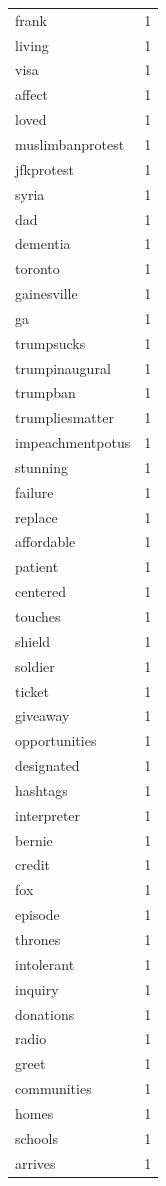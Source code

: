 \begin{tabular}{lr}
frank & 1 \\
living & 1 \\
visa & 1 \\
affect & 1 \\
loved & 1 \\
muslimbanprotest & 1 \\
jfkprotest & 1 \\
syria & 1 \\
dad & 1 \\
dementia & 1 \\
toronto & 1 \\
gainesville & 1 \\
ga & 1 \\
trumpsucks & 1 \\
trumpinaugural & 1 \\
trumpban & 1 \\
trumpliesmatter & 1 \\
impeachmentpotus & 1 \\
stunning & 1 \\
failure & 1 \\
replace & 1 \\
affordable & 1 \\
patient & 1 \\
centered & 1 \\
touches & 1 \\
shield & 1 \\
soldier & 1 \\
ticket & 1 \\
giveaway & 1 \\
opportunities & 1 \\
designated & 1 \\
hashtags & 1 \\
interpreter & 1 \\
bernie & 1 \\
credit & 1 \\
fox & 1 \\
episode & 1 \\
thrones & 1 \\
intolerant & 1 \\
inquiry & 1 \\
donations & 1 \\
radio & 1 \\
greet & 1 \\
communities & 1 \\
homes & 1 \\
schools & 1 \\
arrives & 1 \\

\end{tabular}
